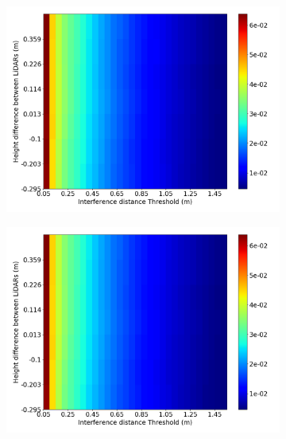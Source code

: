 \begin{figure}[!ht]
\centering
\begin{subfigure}[c]{0.45\textwidth}
	\includegraphics[width=\textwidth]{img/lidar-interference/height/interference_distance_color_mesh.png}
\caption{}%
	\label{fig:height:interference-color-mesh}
\end{subfigure}
\qquad
\begin{subfigure}[c]{0.45\textwidth}
	\includegraphics[width=\textwidth]{img/lidar-interference/height/ground_truth_distance_color_mesh.png}
\caption{}%

\end{subfigure}
\end{figure}
